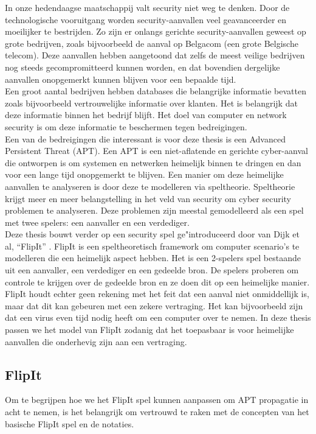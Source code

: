 \documentclass[master=cws, masteroption=vs,english]{kulemt}
\begin{document}
\begin{abstract*}
In onze hedendaagse maatschappij valt security niet weg te denken.  Door de technologische vooruitgang worden security-aanvallen veel geavanceerder en moeilijker te bestrijden. Zo zijn er onlangs gerichte security-aanvallen geweest op grote bedrijven, zoals bijvoorbeeld de aanval op Belgacom (een grote Belgische telecom). Deze aanvallen hebben aangetoond dat zelfs de meest veilige
bedrijven nog steeds gecompromitteerd kunnen worden, en dat bovendien dergelijke aanvallen onopgemerkt kunnen blijven voor een bepaalde tijd. \\

Een groot aantal bedrijven hebben databases die belangrijke informatie bevatten zoals bijvoorbeeld vertrouwelijke informatie over klanten. Het is belangrijk dat deze informatie binnen het bedrijf blijft. Het doel van computer en network security is om deze informatie te beschermen tegen bedreigingen. \\
Een van de bedreigingen die interessant is voor deze thesis is een Advanced Persistent Threat (APT). Een APT is een niet-aflatende en gerichte cyber-aanval die ontworpen is om systemen en netwerken heimelijk binnen te dringen en dan voor een lange tijd onopgemerkt te blijven. Een manier om deze heimelijke aanvallen te analyseren is door deze te modelleren via speltheorie. Speltheorie krijgt meer en meer belangstelling in het veld van security om cyber security problemen te analyseren. Deze problemen zijn meestal gemodelleerd als een spel met twee spelers: een aanvaller en een verdediger. \\

Deze thesis bouwt verder op een security spel ge"introduceerd door van Dijk et al, ``FlipIt'' \citep{FlipIt}.
FlipIt is een speltheoretisch framework om computer scenario's te modelleren die een heimelijk aspect hebben. Het is een 2-spelers spel bestaande uit een aanvaller, een verdediger en een gedeelde bron.  De spelers proberen om controle te krijgen over de gedeelde bron en ze
doen dit op een heimelijke manier. FlipIt houdt echter geen rekening met het feit dat een aanval niet onmiddellijk is, maar dat dit kan gebeuren met een zekere vertraging. Het kan bijvoorbeeld zijn dat een virus even tijd nodig heeft om een computer over te nemen. In deze thesis passen we het model van FlipIt zodanig dat het toepasbaar is voor heimelijke aanvallen die onderhevig zijn aan een vertraging.
 \\

\subsection{FlipIt}
Om te begrijpen hoe we het FlipIt spel kunnen aanpassen om APT propagatie in acht te nemen, is het belangrijk om vertrouwd te raken met de concepten van het basische FlipIt spel en de notaties.  \\


\end{abstract*}
\end{document}
